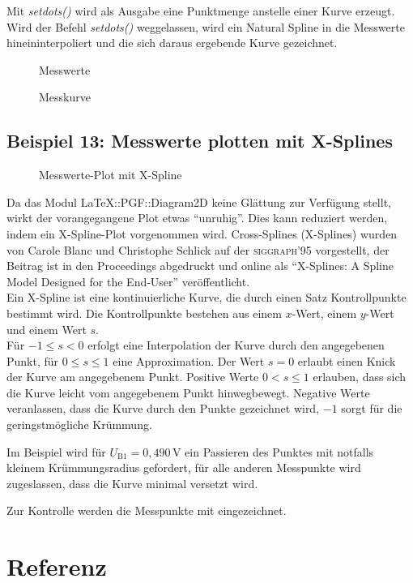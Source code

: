 \documentclass[ngerman,origlongtable]{scrartcl}
\newcommand{\includepgfimage}[2]{%
\begin{figure}%
{\centering%
\caption{#2}\label{fig:#1}%
}%
\end{figure}%
}
\begin{document}
Mit
\textit{set\textunderscore{}dots()\/} wird als Ausgabe eine Punktmenge
anstelle einer Kurve erzeugt.\\
Wird der Befehl
\textit{set\textunderscore{}dots()\/} weggelassen, wird ein Natural Spline
in die Messwerte hineininterpoliert und die sich daraus ergebende Kurve
gezeichnet.
\clearpage
\includepgfimage{../examples/test013a}{Messwerte}
\clearpage

\clearpage
\includepgfimage{../examples/test014a}{Messkurve}
\clearpage

\clearpage
\subsection[X-Splines]{Beispiel 13: Messwerte plotten mit X-Splines}
\includepgfimage{../examples/test015a}{Messwerte-Plot mit X-Spline}
Da das Modul LaTeX::PGF::Diagram2D keine Glättung zur Verfügung stellt, wirkt
der vorangegangene Plot etwas "`unruhig"'.
Dies kann reduziert werden, indem ein X-Spline-Plot vorgenommen wird.
Cross-Splines (X-Splines) wurden von Carole Blanc und Christophe Schlick
auf der \textsc{siggraph}'95 vorgestellt, der Beitrag ist in den
Proceedings abgedruckt und online als "`X-Splines: A Spline Model
Designed for the End-User"' veröffentlicht.\\
Ein X-Spline ist eine kontinuierliche Kurve, die durch einen Satz
Kontrollpunkte bestimmt wird. Die Kontrollpunkte bestehen aus einem
\(x\)-Wert, einem \(y\)-Wert und einem Wert \(s\).\\
Für \(-1\leq{}s<0\) erfolgt eine Interpolation der Kurve durch den
angegebenen Punkt, für \(0\leq{}s\leq{}1\) eine Approximation.
Der Wert \(s=0\) erlaubt einen Knick der Kurve am angegebenem Punkt.
Positive Werte \(0<s\leq{}1\) erlauben, dass sich die Kurve leicht vom
angegebenem Punkt hinwegbewegt. Negative Werte veranlassen, dass die Kurve
durch den Punkte gezeichnet wird, \(-1\) sorgt für die geringstmögliche
Krümmung.

Im Beispiel wird für \(U_{\text{B1}}=0,490\,\text{V}\) ein Passieren des
Punktes mit notfalls kleinem Krümmungsradius gefordert, für alle anderen
Messpunkte wird zugeslassen, dass die Kurve minimal versetzt wird.

Zur Kontrolle werden die Messpunkte mit eingezeichnet.
\clearpage

\clearpage
\section{Referenz}
\end{document}
